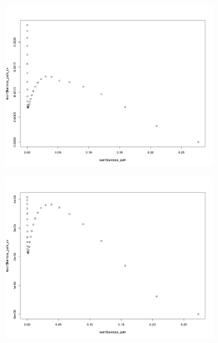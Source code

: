 \documentclass[letterpaper]{article}
\begin{document}
\begin{figure}[H]
\centering
\begin{subfigure}{0.5\textwidth}
  \centering
  \includegraphics[width=1\linewidth]{./result_plot/cv_square/3wrong_path_plot}
\end{subfigure}%
\begin{subfigure}{.5\textwidth}
  \centering
  \includegraphics[width=1\linewidth]{./result_plot/cv_square/4wrong_path_plot}
\end{subfigure}

\end{figure}
\end{document}
